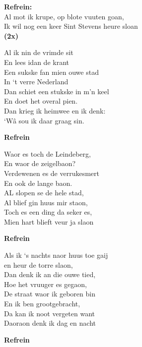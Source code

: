 \textbf{Refrein:}\\
Al mot ik krupe, op blote vuuten goan,\\
Ik wil nog een keer Sint Stevens heure sloan\\
\textbf{(2x)}

Al ik nin de vrimde sit\\
En lees idan de krant\\
Een sukske fan mien ouwe stad\\
In ‘t verre Nederland\\
Dan schiet een stukske in m’n keel\\
 En doet het overal pien.\\
Dan krieg ik heimwee en ik denk:\\
‘Wâ sou ik daar graag sin.

\textbf{Refrein}

Waor es toch de Leindeberg,\\
En waor de zeigelbaon?\\
Verdewenen es de verrukesmert\\
En ook de lange baon.\\
AL slopen se de hele stad,\\
Al blief gin huus mir staon,\\
Toch es een ding da seker es,\\
Mien hart blieft veur ja slaon

\textbf{Refrein}

Als ik ‘s nachts naor huus toe gaij\\
en heur de torre slaon,\\
Dan denk ik an die ouwe tied,\\
Hoe het vruuger es gegaon,\\
De straat waor ik geboren bin\\
En ik ben grootgebracht,\\
Da kan ik noot vergeten want\\
Daoraon denk ik dag en nacht

\textbf{Refrein}
